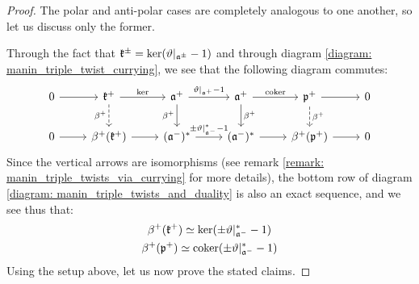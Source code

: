             \begin{proof}
                The polar and anti-polar cases are completely analogous to one another, so let us discuss only the former.

                Through the fact that $\mathfrak{k}^{\pm} = \ker(\vartheta|_{\mathfrak{a}^{\pm}} - 1)$ and through diagram \eqref{diagram: manin_triple_twist_currying}, we see that the following diagram commutes:
                    \begin{equation} \label{diagram: manin_triple_twists_and_duality}
                        \begin{tikzcd}
                        	0 & {\k^+} & {\a^+} & {\a^+} & {\p^+} & 0 \\
                        	0 & {\beta^+(\k^+)} & {(\a^-)^*} & {(\a^-)^*} & {\beta^+(\p^+)} & 0
                        	\arrow[from=1-1, to=1-2]
                        	\arrow["\ker", from=1-2, to=1-3]
                        	\arrow["{\beta^+}"', dashed, from=1-2, to=2-2]
                        	\arrow["{\vartheta|_{\a^+} - 1}", from=1-3, to=1-4]
                        	\arrow["{\beta^+}"', from=1-3, to=2-3]
                        	\arrow["\coker", from=1-4, to=1-5]
                        	\arrow["{\beta^+}", from=1-4, to=2-4]
                        	\arrow[from=1-5, to=1-6]
                        	\arrow["{\beta^+}", dashed, from=1-5, to=2-5]
                        	\arrow[from=2-1, to=2-2]
                        	\arrow[from=2-2, to=2-3]
                        	\arrow["{\pm \vartheta|_{\a^-}^* - 1}", from=2-3, to=2-4]
                        	\arrow[from=2-4, to=2-5]
                        	\arrow[from=2-5, to=2-6]
                        \end{tikzcd}
                    \end{equation}
                Since the vertical arrows are isomorphisms (see remark \ref{remark: manin_triple_twists_via_currying} for more details), the bottom row of diagram \eqref{diagram: manin_triple_twists_and_duality} is also an exact sequence, and we see thus that:
                    $$
                        \begin{gathered}
                            \beta^+(\mathfrak{k}^+) \simeq \ker(\pm \vartheta|_{\mathfrak{a}^-}^* - 1)
                            \\
                            \beta^+(\mathfrak{p}^+) \simeq \operatorname{coker}(\pm \vartheta|_{\mathfrak{a}^-}^* - 1)
                        \end{gathered}
                    $$
                Using the setup above, let us now prove the stated claims.

\end{proof}
